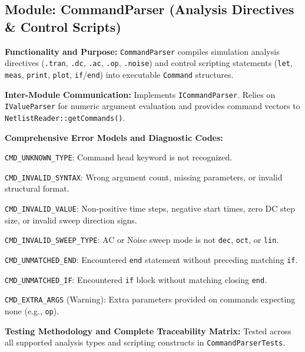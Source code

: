 \subsection{Module: CommandParser (Analysis Directives \& Control Scripts)}

\textbf{Functionality and Purpose:} \texttt{CommandParser} compiles simulation analysis directives (\texttt{.tran}, \texttt{.dc}, \texttt{.ac}, \texttt{.op}, \texttt{.noise}) and control scripting statements (\texttt{let}, \texttt{meas}, \texttt{print}, \texttt{plot}, \texttt{if}/\texttt{end}) into executable \texttt{Command} structures.

\textbf{Inter-Module Communication:} Implements \texttt{ICommandParser}. Relies on \texttt{IValueParser} for numeric argument evaluation and provides command vectors to \texttt{NetlistReader::getCommands()}.

\textbf{Comprehensive Error Models and Diagnostic Codes:}
\begin{compactitem}
    \item \texttt{CMD\_UNKNOWN\_TYPE}: Command head keyword is not recognized.
    \item \texttt{CMD\_INVALID\_SYNTAX}: Wrong argument count, missing parameters, or invalid structural format.
    \item \texttt{CMD\_INVALID\_VALUE}: Non-positive time steps, negative start times, zero DC step size, or invalid sweep direction signs.
    \item \texttt{CMD\_INVALID\_SWEEP\_TYPE}: AC or Noise sweep mode is not \texttt{dec}, \texttt{oct}, or \texttt{lin}.
    \item \texttt{CMD\_UNMATCHED\_END}: Encountered \texttt{end} statement without preceding matching \texttt{if}.
    \item \texttt{CMD\_UNMATCHED\_IF}: Encountered \texttt{if} block without matching closing \texttt{end}.
    \item \texttt{CMD\_EXTRA\_ARGS} (Warning): Extra parameters provided on commands expecting none (e.g., \texttt{op}).
\end{compactitem}

\textbf{Testing Methodology and Complete Traceability Matrix:} Tested across all supported analysis types and scripting constructs in \texttt{CommandParserTests}.

